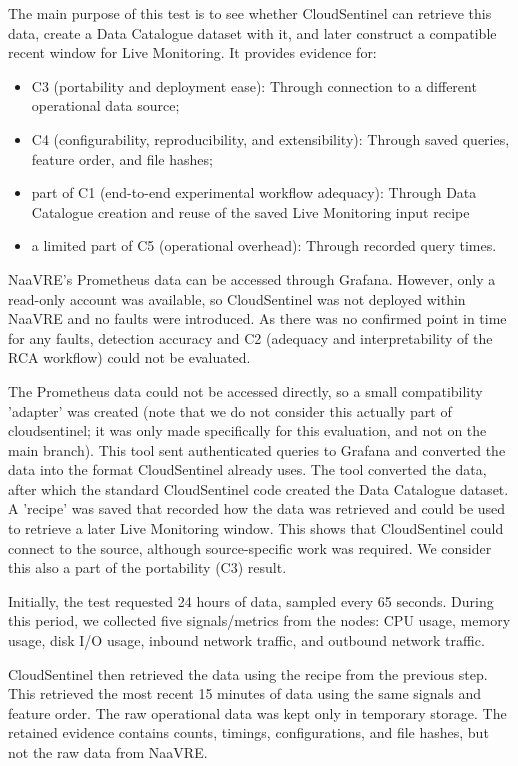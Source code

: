 The main purpose of this test is to see whether CloudSentinel can retrieve this data, create a Data Catalogue dataset with it, and later construct a compatible recent window for Live Monitoring. It provides evidence for:
\begin{itemize}
    \item C3 (portability and deployment ease): Through connection to a different operational data source;
    \item C4 (configurability, reproducibility, and extensibility): Through saved queries, feature order, and file hashes;
    \item part of C1 (end-to-end experimental workflow adequacy): Through Data Catalogue creation and reuse of the saved Live Monitoring input recipe
    \item a limited part of C5 (operational overhead): Through recorded query times.
\end{itemize}

NaaVRE's Prometheus data can be accessed through Grafana. However, only a read-only account was available, so CloudSentinel was not deployed within NaaVRE and no faults were introduced. As there was no confirmed point in time for any faults, detection accuracy and C2 (adequacy and interpretability of the RCA workflow) could not be evaluated.

The Prometheus data could not be accessed directly, so a small compatibility 'adapter' was created (note that we do not consider this actually part of cloudsentinel; it was only made specifically for this evaluation, and not on the main branch). This tool sent authenticated queries to Grafana and converted the data into the format CloudSentinel already uses. The tool converted the data, after which the standard CloudSentinel code created the Data Catalogue dataset. A 'recipe' was saved that recorded how the data was retrieved and could be used to retrieve a later Live Monitoring window. This shows that CloudSentinel could connect to the source, although source-specific work was required. We consider this also a part of the portability (C3) result.

Initially, the test requested 24 hours of data, sampled every 65 seconds. During this period, we collected five signals/metrics from the nodes: CPU usage, memory usage, disk I/O usage, inbound network traffic, and outbound network traffic.

CloudSentinel then retrieved the data using the recipe from the previous step. This retrieved the most recent 15 minutes of data using the same signals and feature order. The raw operational data was kept only in temporary storage. The retained evidence contains counts, timings, configurations, and file hashes, but not the raw data from NaaVRE.

